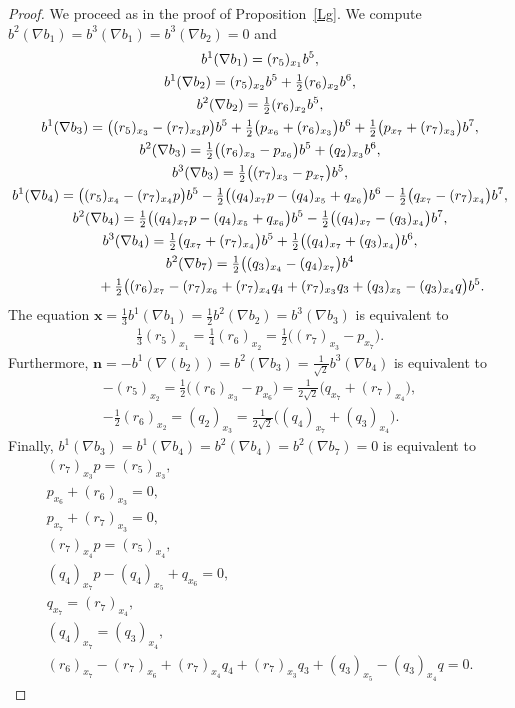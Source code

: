 \documentclass[11pt]{article}
\numberwithin{equation}{section}
\newcommand\bx{{\mathbf x}}
\newcommand\bn{{\mathbf n}}
\begin{document}
\begin{proof}
We proceed as in the proof of Proposition~\ref{Lg}. We compute $b^2(\nabla b_1)=b^3(\nabla b_1) =b^3(\nabla b_2) =0$ and
\begin{gather*}
b^1(\nabla b_1) = (r_5)_{x_1} b^5, \\
b^1(\nabla b_2)= (r_5)_{x_2} b^5+\tfrac12 (r_6)_{x_2} b^6,\\
b^2(\nabla b_2)= \tfrac12 (r_6)_{x_2} b^5,\\
b^1(\nabla b_3)= \big((r_5)_{x_3}- (r_7)_{x_3 }p\big) b^5+\tfrac12 \big(p_{x_6}+(r_6)_{x_3}\big) b^6+\tfrac12 \big(p_{x_7}+(r_7)_{x_3}\big) b^7,\\
 b^2(\nabla b_3)= \tfrac12 \big((r_6)_{x_3}-p_{x_6}\big) b^5 +(q_2)_{x_3}b^6,\\
b^3(\nabla b_3)= \tfrac12 \big((r_7)_{x_3}-p_{x_7}\big) b^5,\\
b^1(\nabla b_4)= \big((r_5)_{x_4}-(r_7)_{x_4}p\big)b^5-\tfrac12\big((q_4)_{x_7}p-(q_4)_{x_5}+q_{x_6} \big)b^6-\tfrac12\big(q_{x_7}-(r_7)_{x_4}\big)b^7,\\
b^2(\nabla b_4)= \tfrac12\big((q_4)_{x_7}p-(q_4)_{x_5}+q_{x_6}\big)b^5-\tfrac12\big((q_4)_{x_7}-(q_3)_{x_4}\big)b^7,\\
b^3(\nabla b_4)= \tfrac12\big(q_{x_7}+(r_7)_{x_4}\big)b^5+\tfrac12\big((q_4)_{x_7}+(q_3)_{x_4}\big)b^6,\\
b^2(\nabla b_7)= \tfrac12\big((q_3)_{x_4}-(q_4)_{x_7}\big)b^4 \\
\hphantom{b^2(\nabla b_7)=}{} +\tfrac12\big((r_6)_{x_7} -(r_7)_{x_6}+(r_7)_{x_4}q_4+(r_7)_{x_3}q_3+(q_3)_{x_5}-(q_3)_{x_4}q\big)b^5.
\end{gather*}
The equation $\bx=\frac13 b^1(\nabla b_1)=\frac12 b^2(\nabla b_2)=b^3(\nabla b_3)$ is equivalent to
\begin{gather}
\tfrac13(r_5)_{x_1} = \tfrac14(r_6)_{x_2} =\tfrac12 \big((r_7)_{x_3}-p_{x_7}\big).\label{ED1}
\end{gather}
Furthermore, $\bn=-b^1(\nabla(b_2))=b^2(\nabla b_3)=\frac1{\sqrt 2} b^3(\nabla b_4)$ is equivalent to
\begin{gather}
 -(r_5)_{x_2} =\tfrac12 \big((r_6)_{x_3}-p_{x_6}\big)=\tfrac1{2\sqrt 2} \big(q_{x_7}+(r_7)_{x_4}\big),\label{ED2}\\
- \tfrac12 (r_6)_{x_2} =(q_2)_{x_3} =\tfrac1{2\sqrt 2}\big((q_4)_{x_7}+(q_3)_{x_4}\big).\label{ED3}
\end{gather}
Finally, $ b^1(\nabla b_3) =b^1(\nabla b_4)=b^2(\nabla b_4 )=b^2(\nabla b_7)=0$ is equivalent to
\begin{gather}
 (r_7)_{x_3 }p=(r_5)_{x_3}, \label{ED4}\\
 p_{x_6}+(r_6)_{x_3}=0, \label{ED5}\\
 p_{x_7}+(r_7)_{x_3}=0, \label{ED6}\\
(r_7)_{x_4}p=(r_5)_{x_4}, \label{ED7}\\
(q_4)_{x_7}p-(q_4)_{x_5}+q_{x_6} =0, \label{ED8}\\
q_{x_7}=(r_7)_{x_4}, \label{ED9}\\
(q_4)_{x_7}=(q_3)_{x_4}, \label{ED11}\\
 (r_6)_{x_7}-(r_7)_{x_6}+(r_7)_{x_4}q_4+(r_7)_{x_3}q_3+(q_3)_{x_5}-(q_3)_{x_4}q=0.\label{ED12}
 \end{gather}


\end{proof}
\end{document}
